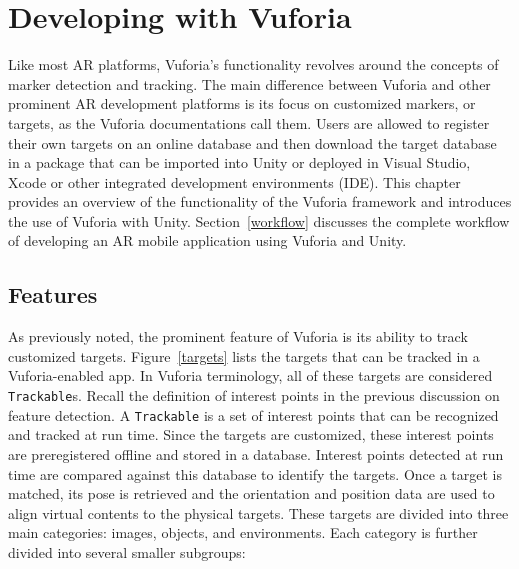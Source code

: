 \chapter{Developing with Vuforia}\label{vuforia}
Like most AR platforms, Vuforia's functionality revolves around the concepts of marker detection and tracking. The main difference between Vuforia and other prominent AR development platforms is its focus on customized markers, or targets, as the Vuforia documentations call them. Users are allowed to register their own targets on an online database and then download the target database in a package that can be imported into Unity or deployed in Visual Studio, Xcode or other integrated development environments (IDE). This chapter provides an overview of the functionality of the Vuforia framework and introduces the use of Vuforia with Unity. Section~\ref{workflow} discusses the complete workflow of developing an AR mobile application using Vuforia and Unity.

\section{Features}
As previously noted, the prominent feature of Vuforia is its ability to track customized targets. Figure~\ref{targets} lists the targets that can be tracked in a Vuforia-enabled app. In Vuforia terminology, all of these targets are considered \texttt{Trackable}s. Recall the definition of interest points in the previous discussion on feature detection. A \texttt{Trackable} is a set of interest points that can be recognized and tracked at run time. Since the targets are customized, these interest points are preregistered offline and stored in a database. Interest points detected at run time are compared against this database to identify the targets. Once a target is matched, its pose is retrieved and the orientation and position data are used to align virtual contents to the physical targets. These targets are divided into three main categories: images, objects, and environments. Each category is further divided into several smaller subgroups:

\begin{figure}[!ht]
\end{figure}

